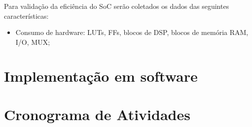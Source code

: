 Para validação da eficiência do SoC serão coletados os dados das seguintes características:
\begin{itemize}
	\item Consumo de hardware: LUTs, FFs, blocos de DSP, blocos de memória RAM, I/O, MUX;
\end{itemize}
 

\section{Implementação em software}


\section{Cronograma de Atividades}


